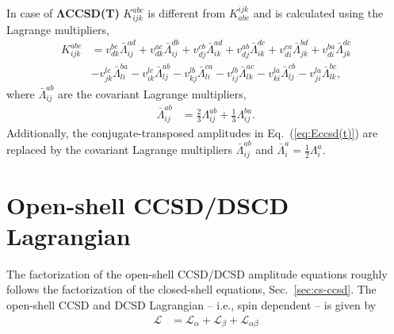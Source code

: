 \documentclass[a4paper,12pt,oneside]{book}
\newcommand{\eq}[1]{Eq.~(\ref{#1})}
\newcommand{\sect}[1]{Sec.~\ref{#1}}
\begin{document}
In case of \textbf{$\mathbf{\Lambda}$CCSD(T)} $K^{abc}_{ijk}$ is different from $K_{abc}^{ijk}$ and is 
calculated using the Lagrange multipliers,
\begin{equation}
\begin{aligned}
K^{abc}_{ijk} &= v_{dk}^{bc} \bar\Lambda_{ij}^{ad} + v_{dk}^{ac} \bar\Lambda_{ij}^{db} + v_{dj}^{cb} \bar\Lambda_{ik}^{ad} 
+ v_{dj}^{ab} \bar\Lambda_{ik}^{dc} + v_{di}^{ca} \bar\Lambda_{jk}^{bd} + v_{di}^{ba} \bar\Lambda_{jk}^{dc} \\
&- v_{jk}^{lc} \bar\Lambda_{li}^{ba} - v_{ik}^{lc} \bar\Lambda_{lj}^{ab} - v_{kj}^{lb} \bar\Lambda_{li}^{ca} 
- v_{ij}^{lb} \bar\Lambda_{lk}^{ac} - v_{ki}^{la} \bar\Lambda_{lj}^{cb} - v_{ji}^{la} \bar\Lambda_{lk}^{bc},
\end{aligned}
\end{equation}
where $\bar\Lambda_{ij}^{ab}$ are the covariant Lagrange multipliers,
\begin{equation}
\begin{aligned}
\bar \Lambda_{ij}^{ab} &= \frac{2}{3}\Lambda_{ij}^{ab} + \frac{1}{3} \Lambda_{ij}^{ba}.
\end{aligned}
\end{equation}
Additionally, the conjugate-transposed amplitudes in \eq{eq:Eccsd(t)} are replaced by the covariant 
Lagrange multipliers $\bar\Lambda_{ij}^{ab}$ and $\bar \Lambda_i^a = \frac{1}{2} \Lambda_i^a$.

\section{Open-shell CCSD/DSCD Lagrangian}
The factorization of the open-shell CCSD/DCSD amplitude equations roughly follows
the factorization of the closed-shell equations, \sect{sec:cs-ccsd}. 
The open-shell CCSD and DCSD Lagrangian -- i.e., spin dependent -- is given by
\begin{equation}
\begin{aligned}
\mathcal{L} &= \mathcal{L}_{\alpha} + \mathcal{L}_{\beta} + \mathcal{L}_{\alpha\beta}
\end{aligned}
\end{equation}
\end{document}
